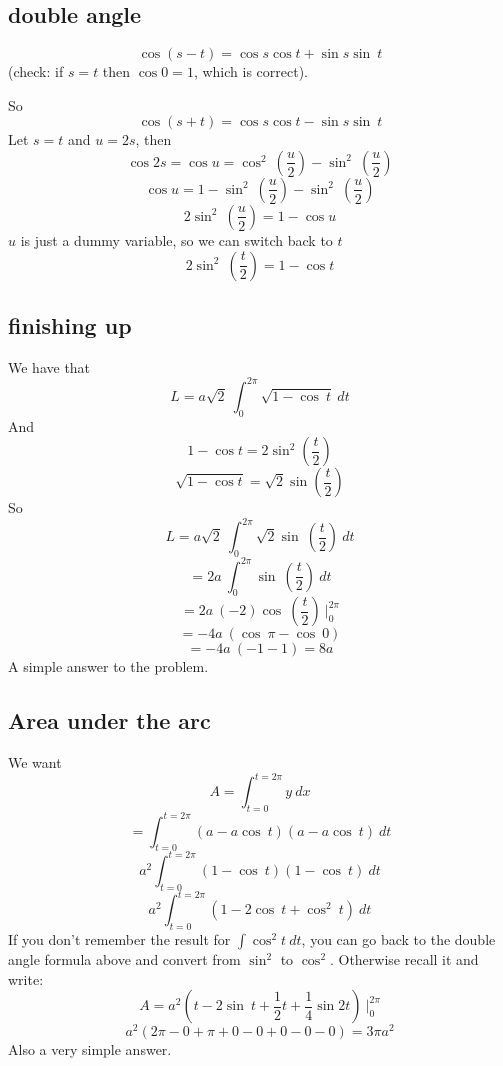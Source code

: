 \documentclass[11pt, oneside]{article}
\begin{document}
\subsection*{double angle}

\[ \cos (s-t) = \cos s \cos t + \sin s \sin \ t \]
(check:  if $s=t$ then $\cos 0 = 1$, which is correct).

So
\[ \cos (s+t) = \cos s \cos t - \sin s \sin \ t \]
Let $s = t$ and $u = 2s$, then
\[ \cos 2s = \cos u = \cos^2 \ (\frac{u}{2}) - \sin^2 \ (\frac{u}{2}) \]
\[ \cos u = 1 - \sin^2 \ (\frac{u}{2}) - \sin^2 \ (\frac{u}{2}) \]
\[ 2 \sin^2 \ (\frac{u}{2}) = 1 - \cos u \]
$u$ is just a dummy variable, so we can switch back to $t$
\[ 2 \sin^2 \ (\frac{t}{2}) = 1 - \cos t \]

\subsection*{finishing up}
We have that 
\[ L = a \sqrt{2} \ \int_0^{2\pi} \sqrt{1 - \cos \ t} \ dt\]
And
\[ 1 - \cos t = 2 \sin^2(\frac{t}{2}) \]
\[ \sqrt{1 - \cos t} = \sqrt{2} \sin(\frac{t}{2}) \]
So
\[ L = a \sqrt{2} \ \int_0^{2\pi} \sqrt{2} \sin \ (\frac{t}{2}) \ dt\]
\[  = 2a  \ \int_0^{2\pi} \sin \ (\frac{t}{2}) \ dt\]
\[ = 2a \ (-2) \cos \ (\frac{t}{2})\ \bigg |_0^{2\pi} \]
\[ = -4a \ (\cos \ \pi - \cos \ 0) \]
\[ = -4a \ (-1 - 1) = 8a\]
A simple answer to the problem.

\subsection*{Area under the arc}
We want
\[ A = \int_{t=0}^{t=2\pi} y \ dx \]
\[ = \int_{t=0}^{t=2\pi} (a - a \cos\ t) (a - a \cos\ t) \ dt \]
\[ a^2\int_{t=0}^{t=2\pi} (1 - \cos\ t) (1 - \cos\ t) \ dt \]
\[ a^2\int_{t=0}^{t=2\pi} (1 - 2 \cos\ t + \cos^2\ t) \ dt \]
If you don't remember the result for $\int \cos^2 t \ dt$, you can go back to the double angle formula above and convert from $\sin^2$ to $\cos^2$.  Otherwise recall it and write:
\[ A = a^2 ( t - 2 \sin \ t + \frac{1}{2}t + \frac{1}{4} \sin 2t ) \ \bigg|_0^{2\pi} \]
\[ a^2 ( 2\pi - 0 + \pi + 0 - 0 + 0 - 0 - 0    ) = 3\pi a^2 \]
Also a very simple answer.
\end{document}
